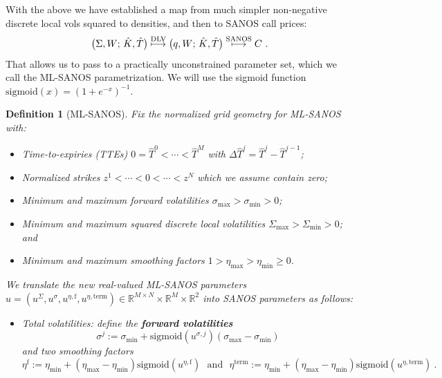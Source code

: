 \documentclass[11pt,a4paper]{article}
\newtheorem{definition}{Definition}[section]
\newcommand{\R}{\mathbb{R}}
\DeclareRobustCommand{\supstack}[2]{\stackrel{\mbox{{\scriptsize ${#1}$}}}{ {#2} }}     %
\DeclareRobustCommand{\eqx}{\begin{equation}}                                         %
\DeclareRobustCommand{\eqend}{\end{equation}}                                         %
\begin{document}
With the above we have established a map from much simpler non-negative discrete local vols squared to
densities, and then to SANOS call prices:
\begin{equation}\label{eq:sanosmap2}
    \big( \Sigma, W;\, \hat K,\hat T\big) \supstack{\mathrm{DLV}}\longmapsto
    \big( q, W;\, \hat K,\hat T\big) \supstack{\mathrm{SANOS}}\longmapsto C \ .
\end{equation}
That allows us to pass to a practically unconstrained parameter set, which we call the ML-SANOS parametrization.
We will use the sigmoid function $\mathrm{sigmoid}(x)=(1+e^{-x})^{-1}$.

\begin{definition}[ML-SANOS]\label{def:ml-sanos}
    Fix the normalized grid geometry for ML-SANOS with:
    \begin{itemize}
        \item Time-to-expiries (TTEs) $0=\hat T^0<\cdots<\hat T^M$ with
        $\Delta\hat T^j = \hat T^j-\hat T^{j-1}$;
        \item Normalized strikes $z^1<\cdots<0<\cdots<z^N$ which we assume contain zero;
        \item Minimum and maximum forward volatilities $\sigma_{\max} > \sigma_{\min} > 0$; 
        \item Minimum and maximum squared discrete local volatilities $\Sigma_{\max} > \Sigma_{\min} > 0$; and
        \item Minimum and maximum smoothing factors $1> \eta_{\max} > \eta_{\min} \geq 0$.
    \end{itemize}
    We translate the new real-valued ML-SANOS parameters
    $u=(u^\Sigma,u^\sigma,u^{\eta,\mathrm f},u^{\eta,\mathrm{term}})
    \in\R^{M\times N}\times\R^M\times\R^2$ into SANOS parameters as follows:
    \begin{itemize}
        \item Total volatilities: 
        define the \textbf{forward volatilities}
             \eqx
                    \sigma^j := \sigma_{\min}
               +\mathrm{sigmoid}( u^{\sigma,j} ) ( \sigma_{\max} - \sigma_{\min} )
            \eqend
            and two smoothing factors
            \begin{equation}
                \label{eq:etatrans}
                \eta^{\mathrm f}:=\eta_{\min}
                  +(\eta_{\max}-\eta_{\min})
                    \mathrm{sigmoid}(u^{\eta,\mathrm f}) \ \ \ \mbox{and} \ \ \
                \eta^{\mathrm{term}}:=\eta_{\min}
                  +(\eta_{\max}-\eta_{\min})
                    \mathrm{sigmoid}(u^{\eta,\mathrm{term}}) \ .

\end{equation}
\end{itemize}
\end{definition}
\end{document}
